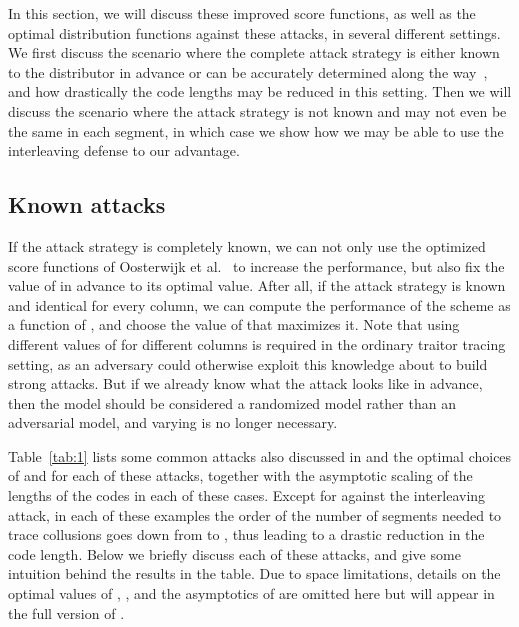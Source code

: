 \documentclass[10pt,a4paper,twocolumn]{article}
\begin{document}
In this section, we will discuss these improved score functions, as well as the optimal distribution functions against these attacks, in several different settings. We first discuss the scenario where the complete attack strategy is either known to the distributor in advance or can be accurately determined along the way~\cite{furon09b}, and how drastically the code lengths may be reduced in this setting. Then we will discuss the scenario where the attack strategy is not known and may not even be the same in each segment, in which case we show how we may be able to use the interleaving defense to our advantage. 



\subsection{Known attacks}

If the attack strategy is completely known, we can not only use the optimized score functions of Oosterwijk et al.~\cite{oosterwijk13} to increase the performance, but also fix the value of  in advance to its optimal value. After all, if the attack strategy is known and identical for every column, we can compute the performance of the scheme as a function of , and choose the value of  that maximizes it. Note that using different values of  for different columns is required in the ordinary traitor tracing setting, as an adversary could otherwise exploit this knowledge about  to build strong attacks. But if we already know what the attack looks like in advance, then the model should be considered a randomized model rather than an adversarial model, and varying  is no longer necessary.

Table~\ref{tab:1} lists some common attacks also discussed in \cite{oosterwijk13} and the optimal choices of  and  for each of these attacks, together with the asymptotic scaling of the lengths of the codes in each of these cases. Except for against the interleaving attack, in each of these examples the order of the number of segments needed to trace collusions goes down from  to , thus leading to a drastic reduction in the code length. Below we briefly discuss each of these attacks, and give some intuition behind the results in the table. Due to space limitations, details on the optimal values of , , and the asymptotics of  are omitted here but will appear in the full version of \cite{laarhoven13allerton}.
\end{document}
